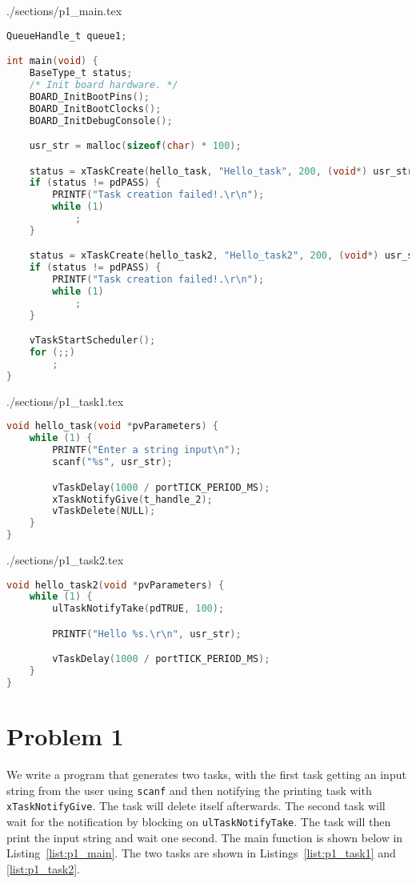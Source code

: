 \begin{filecontents}[overwrite]{./sections/p1_main.tex}
\begin{lstlisting}[language=c,caption=Problem 1 main, label=list:p1_main]
QueueHandle_t queue1;

int main(void) {
    BaseType_t status;
    /* Init board hardware. */
    BOARD_InitBootPins();
    BOARD_InitBootClocks();
    BOARD_InitDebugConsole();

    usr_str = malloc(sizeof(char) * 100);

    status = xTaskCreate(hello_task, "Hello_task", 200, (void*) usr_str, 2, &t_handle_1);
    if (status != pdPASS) {
        PRINTF("Task creation failed!.\r\n");
        while (1)
            ;
    }

    status = xTaskCreate(hello_task2, "Hello_task2", 200, (void*) usr_str, 3, &t_handle_2);
    if (status != pdPASS) {
        PRINTF("Task creation failed!.\r\n");
        while (1)
            ;
    }

    vTaskStartScheduler();
    for (;;)
        ;
}   
\end{lstlisting}
\end{filecontents}

\begin{filecontents}[overwrite]{./sections/p1_task1.tex}
\begin{lstlisting}[language=c,caption=Problem 1 Input Task, label=list:p1_task1]
void hello_task(void *pvParameters) {
    while (1) {
        PRINTF("Enter a string input\n");
        scanf("%s", usr_str);

        vTaskDelay(1000 / portTICK_PERIOD_MS);
        xTaskNotifyGive(t_handle_2);
        vTaskDelete(NULL);
    }
}
\end{lstlisting}
\end{filecontents}


\begin{filecontents}[overwrite]{./sections/p1_task2.tex}
\begin{lstlisting}[language=c,caption=Problem 1 Print Task, label=list:p1_task2]
void hello_task2(void *pvParameters) {
    while (1) {
        ulTaskNotifyTake(pdTRUE, 100);

        PRINTF("Hello %s.\r\n", usr_str);

        vTaskDelay(1000 / portTICK_PERIOD_MS);
    }
}
\end{lstlisting}
\end{filecontents}

\section*{Problem 1}
We write a program that generates two tasks, with the first task getting an input string from the user using \texttt{scanf} and then notifying the printing task with \texttt{xTaskNotifyGive}. The task will delete itself afterwards. The second task will wait for the notification by blocking on \texttt{ulTaskNotifyTake}. The task will then print the input string and wait one second. The main function is shown below in Listing~\ref{list:p1_main}. The two tasks are shown in Listings~\ref{list:p1_task1} and \ref{list:p1_task2}.



